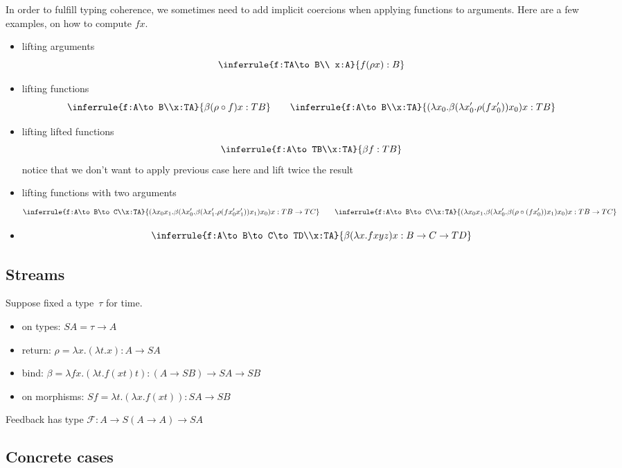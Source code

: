 \documentclass[a4paper,titlepage]{article}
\begin{document}
In order to fulfill typing coherence, we sometimes need to add implicit
coercions when applying functions to arguments. Here are a few examples, on how to compute $fx$.
\begin{itemize}
\item lifting arguments
  \[
  \inferrule{f:TA\to B\\ x:A}{f(\rho x):B}
  \]
\item lifting functions
  \[
  \inferrule{f:A\to B\\x:TA}{\beta(\rho\circ f)x:TB}
  \qquad
  \inferrule{f:A\to B\\x:TA}{(\lambda x_0.\beta(\lambda x_0'.\rho(f x_0'))x_0)x:TB}
  \]
\item lifting lifted functions
  \[
  \inferrule{f:A\to TB\\x:TA}{\beta f:TB}
  \]
  notice that we don't want to apply previous case here and lift twice the result
\item lifting functions with two arguments
  \[
  \inferrule{f:A\to B\to C\\x:TA}{(\lambda x_0 x_1.\beta(\lambda x_0'.\beta(\lambda x_1'.\rho(f x_0' x_1'))x_1)x_0)x:TB\to TC}
  \qquad
  \inferrule{f:A\to B\to C\\x:TA}{(\lambda x_0 x_1.\beta(\lambda x_0'.\beta(\rho\circ(f x_0'))x_1)x_0)x:TB\to TC}
  \]
\item
  \[
  \inferrule{f:A\to B\to C\to TD\\x:TA}{\beta(\lambda x.f x y z)x:B\to C\to TD}
  \]
\end{itemize}


\subsection{Streams}
Suppose fixed a type~$\tau$ for time.
\begin{itemize}
\item on types: $SA=\tau\to A$
\item return: $\rho=\lambda x.(\lambda t.x):A\to SA$
\item bind: $\beta=\lambda fx.(\lambda t.f(xt)t):(A\to SB)\to SA\to SB$
\item on morphisms: $Sf=\lambda t.(\lambda x.f(xt)):SA\to SB$
\end{itemize}

Feedback has type $\mathcal{F}:A\to S(A\to A)\to SA$

\subsection{Concrete cases}
\end{document}
